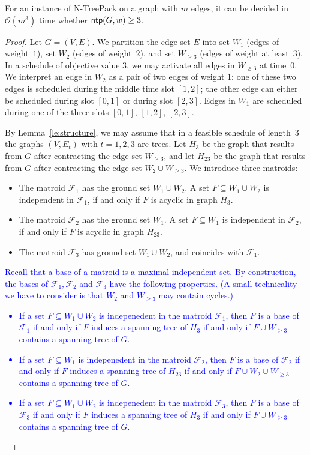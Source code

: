 \documentclass[runningheads]{llncs}
\newcommand{\bigO}{\mathcal{O}}
\newcommand{\xxxNTP}{{\sc N-TreePack}}
\DeclareMathOperator{\ntp}{\text{\sf ntp}}
\newcommand{\lasse}[1]{\textcolor{blue}{#1}}
\begin{document}
\begin{theorem}
\label{th:value=3}
For an instance of {\xxxNTP} on a graph with $m$ edges, it can be decided in $\bigO(m^3)$ time 
whether $\ntp(G,w)\ge3$.
\end{theorem}
\begin{proof}
Let $G=(V,E)$. 
We partition the edge set $E$ into set $W_1$ (edges of weight~$1$), set $W_2$ (edges of weight~$2$),
and set $W_{\ge3}$ (edges of weight at least~$3$).
In a schedule of objective value $3$, we may activate all edges in $W_{\ge3}$ at time~$0$.
We interpret an edge in $W_2$ as a pair of two edges of weight $1$: one of these two edges is scheduled 
during the middle time slot $[1, 2]$; the other edge can either be scheduled during slot $[0,1]$ 
or during slot $[2,3]$. 
Edges in $W_1$ are scheduled during one of the three slots $[0,1]$, $[1,2]$, $[2,3]$.

By Lemma~\ref{le:structure}, we may assume that in a feasible schedule of length~$3$ the 
graphs $(V,E_t)$ with $t=1,2,3$ are trees.
Let $H_3$    be the graph that results from $G$ after contracting the edge set $W_{\ge3}$, and
let $H_{23}$ be the graph that results from $G$ after contracting the edge set $W_2\cup W_{\ge3}$.
We introduce three matroids:
\begin{itemize}
\item The matroid $\mathcal{F}_1$ has the ground set $W_1\cup W_2$. 
A set $F\subseteq W_1\cup W_2$ is independent in $\mathcal{F}_1$, if and only if $F$ is acyclic in graph $H_3$.
\item The matroid $\mathcal{F}_2$ has the ground set $W_1$.
A set $F\subseteq W_1$ is independent in $\mathcal{F}_2$, if and only if $F$ is acyclic in graph $H_{23}$.
\item The matroid $\mathcal{F}_3$ has ground set $W_1\cup W_2$, and coincides with $\mathcal{F}_1$.
\end{itemize}
\lasse{Recall that a base of a matroid is a maximal independent set. By construction, the bases of $\mathcal{F}_1, \mathcal{F}_2$ and $\mathcal{F}_3$ have the following properties. (A small technicality we have to consider is that $W_2$ and $W_{\geq3}$ may contain cycles.)}
\lasse{
\begin{itemize}
\item If a set $F \subseteq W_1 \cup W_2$ is indepenedent in the matroid $\mathcal{F}_1$, then $F$ is a base of $\mathcal{F}_1$ if and only if $F$ induces a spanning tree of $H_3$ if and only if $F \cup W_{\geq 3}$ contains a spanning tree of $G$.
\item If a set $F \subseteq W_1$ is indepenedent in the matroid $\mathcal{F}_2$, then $F$ is a base of $\mathcal{F}_2$ if and only if $F$ induces a spanning tree of $H_{23}$ if and only if $F \cup W_2 \cup W_{\geq 3}$ contains a spanning tree of $G$.
\item If a set $F \subseteq W_1 \cup W_2$ is indepenedent in the matroid $\mathcal{F}_3$, then $F$ is a base of $\mathcal{F}_3$ if and only if $F$ induces a spanning tree of $H_3$ if and only if $F \cup W_{\geq 3}$ contains a spanning tree of $G$.
\end{itemize}
}


\end{proof}
\end{document}
